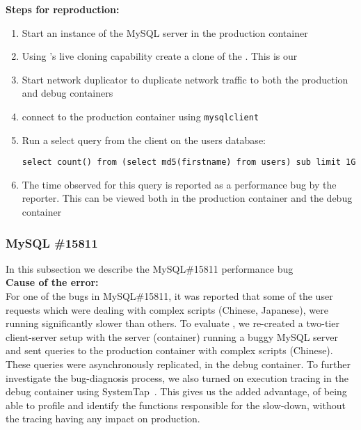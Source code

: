 \noindent \textbf{Steps for reproduction:} \\

\begin{adjustwidth}{0.5cm}{}
	\begin{enumerate}
		\item Start an instance of the MySQL server in the production container
		\item Using \parikshan's live cloning capability create a clone of the \productioncontainer. This is our \debugcontainer
		\item Start network duplicator to duplicate network traffic to both the production and debug containers
		\item connect to the production container using \texttt{mysqlclient}
		\item Run a select query from the client on the users database:
		
		\texttt{select count(\*) from (select md5(firstname) from users) sub limit 1G}

		
		\item The time observed for this query is reported as a performance bug by the reporter. This can be viewed both in the production container and the debug container
		
	\end{enumerate}
\end{adjustwidth}	



\subsubsection{MySQL \#15811}

In this subsection we describe the MySQL\#15811 performance bug \\

\noindent \textbf{Cause of the error:} \\

For one of the bugs in  MySQL\#15811, it was reported that some of the user requests which were dealing with complex scripts (Chinese, Japanese), were running significantly slower than others.
To evaluate \parikshan, we re-created a two-tier client-server setup with the server (container) running a buggy MySQL server and sent queries to the production container with complex scripts (Chinese).
These queries were asynchronously replicated, in the debug container. To further investigate the bug-diagnosis process, we also turned on execution tracing in the debug container using SystemTap~\cite{systemtap}.
This gives us the added advantage, of being able to profile and identify the functions responsible for the slow-down, without the tracing having any impact on production.\\

